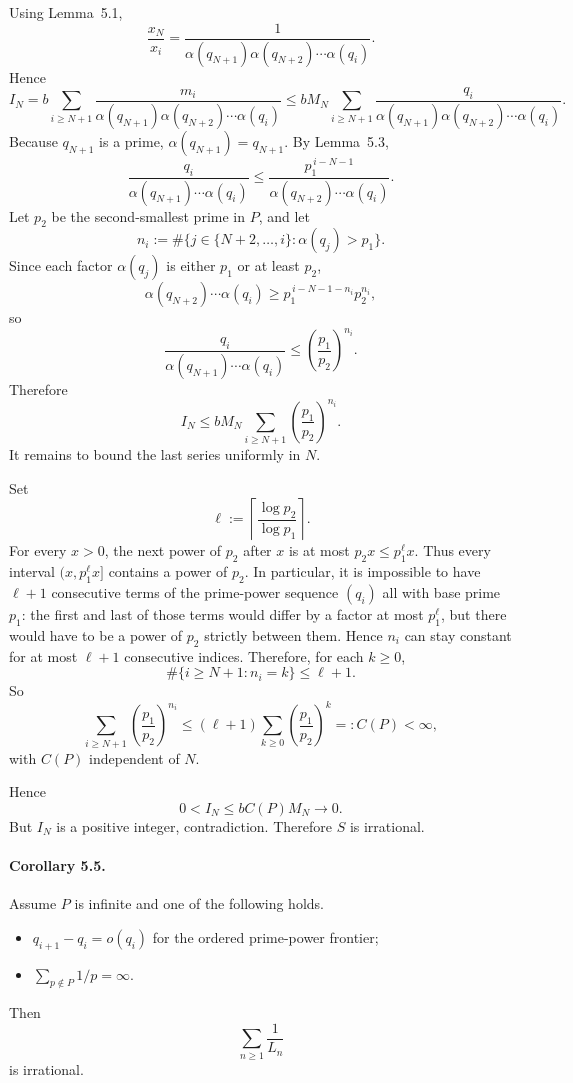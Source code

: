 Using Lemma~5.1,
\[
\frac{x_N}{x_i}
=
\frac1{\alpha(q_{N+1})\alpha(q_{N+2})\cdots \alpha(q_i)}.
\]
Hence
\[
I_N
=
 b\sum_{i\ge N+1}
 \frac{m_i}{\alpha(q_{N+1})\alpha(q_{N+2})\cdots \alpha(q_i)}
\le
 b M_N
 \sum_{i\ge N+1}
 \frac{q_i}{\alpha(q_{N+1})\alpha(q_{N+2})\cdots \alpha(q_i)}.
\]
Because $q_{N+1}$ is a prime, $\alpha(q_{N+1})=q_{N+1}$. By Lemma~5.3,
\[
\frac{q_i}{\alpha(q_{N+1})\cdots \alpha(q_i)}
\le
\frac{p_1^{\,i-N-1}}{\alpha(q_{N+2})\cdots \alpha(q_i)}.
\]
Let $p_2$ be the second-smallest prime in $P$, and let
\[
n_i:=\#\{j\in\{N+2,\dots,i\}: \alpha(q_j)>p_1\}.
\]
Since each factor $\alpha(q_j)$ is either $p_1$ or at least $p_2$,
\[
\alpha(q_{N+2})\cdots \alpha(q_i)
\ge
p_1^{\,i-N-1-n_i}p_2^{n_i},
\]
so
\[
\frac{q_i}{\alpha(q_{N+1})\cdots \alpha(q_i)}
\le
\left(\frac{p_1}{p_2}\right)^{n_i}.
\]
Therefore
\[
I_N\le b M_N \sum_{i\ge N+1}\left(\frac{p_1}{p_2}\right)^{n_i}.
\]
It remains to bound the last series uniformly in $N$.

Set
\[
\ell:=\left\lceil \frac{\log p_2}{\log p_1}\right\rceil.
\]
For every $x>0$, the next power of $p_2$ after $x$ is at most $p_2 x\le p_1^{\ell}x$. Thus every interval $(x,p_1^{\ell}x]$ contains a power of $p_2$. In particular, it is impossible to have $\ell+1$ consecutive terms of the prime-power sequence $(q_i)$ all with base prime $p_1$: the first and last of those terms would differ by a factor at most $p_1^{\ell}$, but there would have to be a power of $p_2$ strictly between them. Hence $n_i$ can stay constant for at most $\ell+1$ consecutive indices. Therefore, for each $k\ge 0$,
\[
\#\{i\ge N+1: n_i=k\}\le \ell+1.
\]
So
\[
\sum_{i\ge N+1}\left(\frac{p_1}{p_2}\right)^{n_i}
\le
(\ell+1)\sum_{k\ge 0}\left(\frac{p_1}{p_2}\right)^k
=:C(P)<\infty,
\]
with $C(P)$ independent of $N$.

Hence
\[
0<I_N\le b C(P) M_N\to 0.
\]
But $I_N$ is a positive integer, contradiction. Therefore $S$ is irrational. 

\paragraph{Corollary 5.5.}
Assume $P$ is infinite and one of the following holds.

\begin{itemize}
\item[(i)] $q_{i+1}-q_i=o(q_i)$ for the ordered prime-power frontier;
\item[(ii)] $\sum_{p\notin P}1/p=\infty$.
\end{itemize}
Then
\[
\sum_{n\ge 1}\frac1{L_n}
\]
is irrational.

